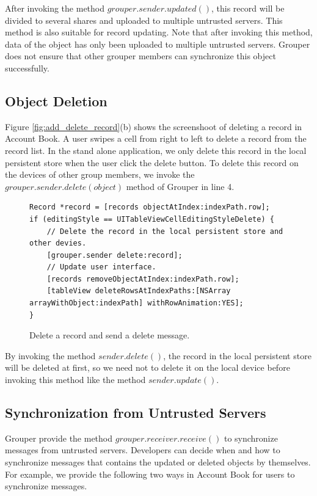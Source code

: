 \documentclass[a4paper,11pt]{report}
\begin{document}
After invoking the method $grouper.sender.updated()$, this record will be divided to several shares and uploaded to multiple untrusted servers.
This method is also suitable for record updating.
Note that after invoking this method, data of the object has only been uploaded to multiple untrusted servers.
Grouper does not ensure that other grouper members can synchronize this object successfully.

\subsection{Object Deletion}

Figure \ref{fig:add_delete_record}(b) shows the screenshoot of deleting a record in Account Book. 
A user swipes a cell from right to left to delete a record from the record list.
In the stand alone application, we only delete this record in the local persistent store when the user click the delete button.
To delete this record on the devices of other group members, we invoke the $grouper.sender.delete(object)$ method of Grouper in line 4.

\begin{figure}
\begin{lstlisting}[frame=none language=Objective-C] 
Record *record = [records objectAtIndex:indexPath.row];
if (editingStyle == UITableViewCellEditingStyleDelete) {
    // Delete the record in the local persistent store and other devies.
    [grouper.sender delete:record];
    // Update user interface.
    [records removeObjectAtIndex:indexPath.row];
    [tableView deleteRowsAtIndexPaths:[NSArray arrayWithObject:indexPath] withRowAnimation:YES];
}
\end{lstlisting}
\caption{Delete a record and send a delete message.}
\label{fig:delete_record}
\end{figure}

By invoking the method $sender.delete()$, the record in the local persistent store will be deleted at first, so we need not to delete it on the local device before invoking this method like the method $sender.update()$.

\subsection{Synchronization from Untrusted Servers}

Grouper provide the method $grouper.receiver.receive()$ to synchronize messages from untrusted servers.
Developers can decide when and how to synchronize messages that contains the updated or deleted objects by themselves.
For example, we provide the following two ways in Account Book for users to synchronize messages.
\end{document}
